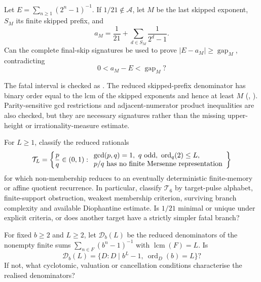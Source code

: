 \documentclass[11pt]{article}
\newcommand{\Ach}{\mathcal A}
\begin{document}
\begin{problem}\label{prob:fatal-interval}
Let $E=\sum_{n\ge1}(2^n-1)^{-1}$.  If $1/21\notin\Ach$, let $M$ be the last
skipped exponent, $S_M$ its finite skipped prefix, and
\[
 a_M=\frac1{21}+\sum_{d\in S_M}\frac1{2^d-1}.
\]
Can the complete final-skip signatures be used to prove
$|E-a_M|\ge\operatorname{gap}_M$, contradicting
\[
 0<a_M-E<\operatorname{gap}_M?
\]
\end{problem}

\noindent The fatal interval is checked as
.
The reduced skipped-prefix denominator has binary order equal to the lcm of
the skipped exponents and hence at least $M$
(,
).
Parity-sensitive gcd restrictions and adjacent-numerator product inequalities
are also checked, but they are necessary signatures rather than the missing
upper-height or irrationality-measure estimate.

\begin{problem}\label{prob:target-classification}
For $L\ge1$, classify the reduced rationals
\[
 \mathcal T_L=\left\{\frac pq\in(0,1):
 \begin{array}{l}
 \gcd(p,q)=1,\ q\ \hbox{odd},\ \operatorname{ord}_q(2)\le L,\\
 p/q\ \hbox{has no finite Mersenne representation}
 \end{array}\right\}
\]
for which non-membership reduces to an eventually deterministic finite-memory
or affine quotient recurrence.  In particular, classify $\mathcal T_6$ by
target-pulse alphabet, finite-support obstruction, weakest membership
criterion, surviving branch complexity and available Diophantine estimate.
Is $1/21$ minimal or unique under explicit criteria, or does another target
have a strictly simpler fatal branch?
\end{problem}

\begin{problem}\label{prob:denominator-realisation}
For fixed $b\ge2$ and $L\ge2$, let $\mathcal D_b(L)$ be the reduced
denominators of the nonempty finite sums
$\sum_{n\in F}(b^n-1)^{-1}$ with $\operatorname{lcm}(F)=L$.  Is
\[
 \mathcal D_b(L)=
 \{D:D\mid b^L-1,\ \operatorname{ord}_D(b)=L\}?
\]
If not, what cyclotomic, valuation or cancellation conditions characterise
the realised denominators?
\end{problem}
\end{document}
